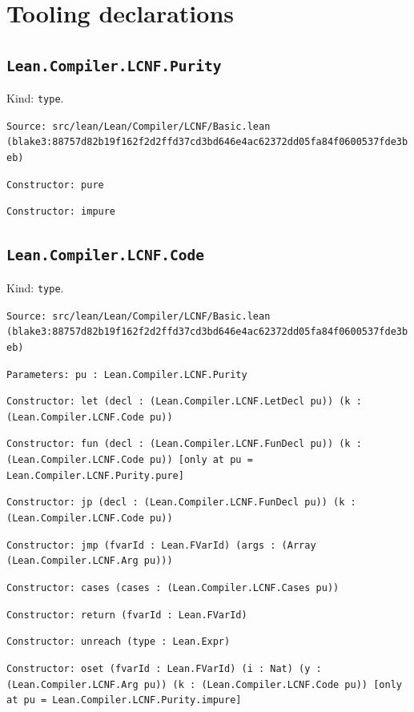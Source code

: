 \documentclass[11pt]{article}
\begin{document}
\section*{Tooling declarations}
\subsection*{\texttt{Lean.Compiler.LCNF.Purity}}
\noindent Kind: \texttt{type}.\par
\noindent \texttt{Source: src/lean/Lean/Compiler/LCNF/Basic.lean (blake3:88757d82b19f162f2d2ffd37cd3bd646e4ac62372dd05fa84f0600537fde3beb)}\par
\noindent \texttt{Constructor: pure }\par
\noindent \texttt{Constructor: impure }\par
\subsection*{\texttt{Lean.Compiler.LCNF.Code}}
\noindent Kind: \texttt{type}.\par
\noindent \texttt{Source: src/lean/Lean/Compiler/LCNF/Basic.lean (blake3:88757d82b19f162f2d2ffd37cd3bd646e4ac62372dd05fa84f0600537fde3beb)}\par
\noindent \texttt{Parameters: pu : Lean.Compiler.LCNF.Purity}\par
\noindent \texttt{Constructor: let (decl : (Lean.Compiler.LCNF.LetDecl pu)) (k : (Lean.Compiler.LCNF.Code pu))}\par
\noindent \texttt{Constructor: fun (decl : (Lean.Compiler.LCNF.FunDecl pu)) (k : (Lean.Compiler.LCNF.Code pu)) [only at pu = Lean.Compiler.LCNF.Purity.pure]}\par
\noindent \texttt{Constructor: jp (decl : (Lean.Compiler.LCNF.FunDecl pu)) (k : (Lean.Compiler.LCNF.Code pu))}\par
\noindent \texttt{Constructor: jmp (fvarId : Lean.FVarId) (args : (Array (Lean.Compiler.LCNF.Arg pu)))}\par
\noindent \texttt{Constructor: cases (cases : (Lean.Compiler.LCNF.Cases pu))}\par
\noindent \texttt{Constructor: return (fvarId : Lean.FVarId)}\par
\noindent \texttt{Constructor: unreach (type : Lean.Expr)}\par
\noindent \texttt{Constructor: oset (fvarId : Lean.FVarId) (i : Nat) (y : (Lean.Compiler.LCNF.Arg pu)) (k : (Lean.Compiler.LCNF.Code pu)) [only at pu = Lean.Compiler.LCNF.Purity.impure]}\par
\end{document}
